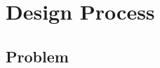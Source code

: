 \documentclass[conference]{IEEEtran}
\begin{document}
	
	
	
	
	
	\section{Design Process}
	\subsection{Problem}
\end{document}
